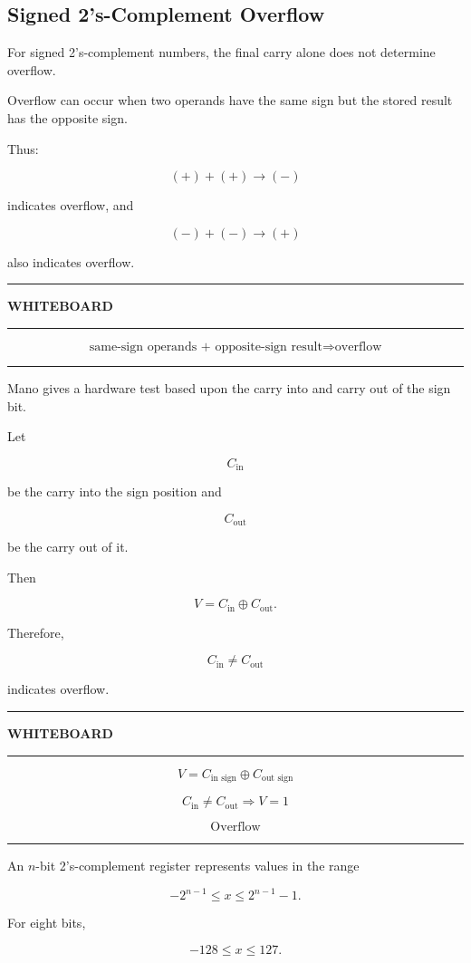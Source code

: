 \documentclass[11pt]{article}
\newenvironment{whiteboard}
{
    \par\medskip
    \begin{center}
    \begin{minipage}{0.94\textwidth}
    \hrule
    \vspace{0.4em}
    \textbf{\large WHITEBOARD}
    \vspace{0.3em}
    \hrule
    \vspace{0.7em}
}
{
    \vspace{0.5em}
    \hrule
    \end{minipage}
    \end{center}
    \medskip
}
\begin{document}
\subsection{Signed 2's-Complement Overflow}

For signed 2's-complement numbers, the final carry alone does not determine
overflow.

Overflow can occur when two operands have the same sign but the stored result
has the opposite sign.

Thus:

\[
(+)+(+)\rightarrow(-)
\]

indicates overflow, and

\[
(-)+(-)\rightarrow(+)
\]

also indicates overflow.

\begin{whiteboard}
\[
\boxed{
\text{same-sign operands + opposite-sign result}
\Rightarrow
\text{overflow}}
\]
\end{whiteboard}

Mano gives a hardware test based upon the carry into and carry out of the sign
bit.

Let

\[
C_{\text{in}}
\]

be the carry into the sign position and

\[
C_{\text{out}}
\]

be the carry out of it.

Then

\[
V=C_{\text{in}}\oplus C_{\text{out}}.
\]

Therefore,

\[
C_{\text{in}}\neq C_{\text{out}}
\]

indicates overflow.

\begin{whiteboard}
\[
\boxed{V=C_{\text{in sign}}\oplus C_{\text{out sign}}}
\]

\[
C_{\text{in}}\neq C_{\text{out}}
\Rightarrow
V=1
\]

\[
\boxed{\text{Overflow}}
\]
\end{whiteboard}

An \(n\)-bit 2's-complement register represents values in the range

\[
-2^{n-1}
\leq x \leq
2^{n-1}-1.
\]

For eight bits,

\[
-128\leq x\leq127.
\]
\end{document}
